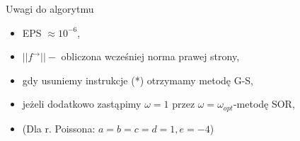 \begin{frame}{}
  \begin{block}{Uwagi do algorytmu}
    \begin{itemize}
      \item EPS $\approx 10^{-6}$,
      \item $||f^\rightarrow|| -$ obliczona wcześniej norma prawej strony,
      \item gdy usuniemy instrukcje (*) otrzymamy metodę G-S,
      \item jeżeli dodatkowo zastąpimy $\omega=1$ przez $\omega=\omega_{opt}$-metodę SOR,
      \item (Dla r. Poissona: $a=b=c=d=1, e=-4$)
    \end{itemize}
  \end{block}
\end{frame}

